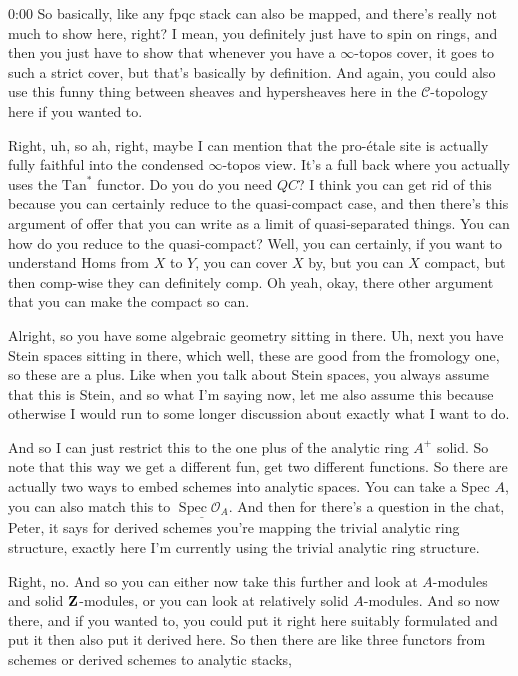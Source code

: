\begin{unfinished}{0:00}
So basically, like any fpqc stack can also be mapped, and there's really not much to show here, right? I mean, you definitely just have to spin on rings, and then you just have to show that whenever you have a $\infty$-topos cover, it goes to such a strict cover, but that's basically by definition. And again, you could also use this funny thing between sheaves and hypersheaves here in the $\mathcal{C}$-topology here if you wanted to.

Right, uh, so ah, right, maybe I can mention that the pro-étale site is actually fully faithful into the condensed $\infty$-topos view. It's a full back where you actually uses the $\mathrm{Tan}^{*}$ functor. Do you do you need $QC$? I think you can get rid of this because you can certainly reduce to the quasi-compact case, and then there's this argument of offer that you can write as a limit of quasi-separated things. You can how do you reduce to the quasi-compact? Well, you can certainly, if you want to understand Homs from $X$ to $Y$, you can cover $X$ by, but you can $X$ compact, but then comp-wise they can definitely comp. Oh yeah, okay, there other argument that you can make the compact so can.

Alright, so you have some algebraic geometry sitting in there. Uh, next you have Stein spaces sitting in there, which well, these are good from the fromology one, so these are a plus. Like when you talk about Stein spaces, you always assume that this is Stein, and so what I'm saying now, let me also assume this because otherwise I would run to some longer discussion about exactly what I want to do.

And so I can just restrict this to the one plus of the analytic ring $A^{+}$ solid. So note that this way we get a different fun, get two different functions. So there are actually two ways to embed schemes into analytic spaces. You can take a Spec $A$, you can also match this to $\underline{\operatorname{Spec} \mathcal{O}_{A}}$. And then for there's a question in the chat, Peter, it says for derived schemes you're mapping the trivial analytic ring structure, exactly here I'm currently using the trivial analytic ring structure.

Right, no. And so you can either now take this further and look at $A$-modules and solid $\mathbf Z$-modules, or you can look at relatively solid $A$-modules. And so now there, and if you wanted to, you could put it right here suitably formulated and put it then also put it derived here. So then there are like three functors from schemes or derived schemes to analytic stacks,


\end{unfinished}
